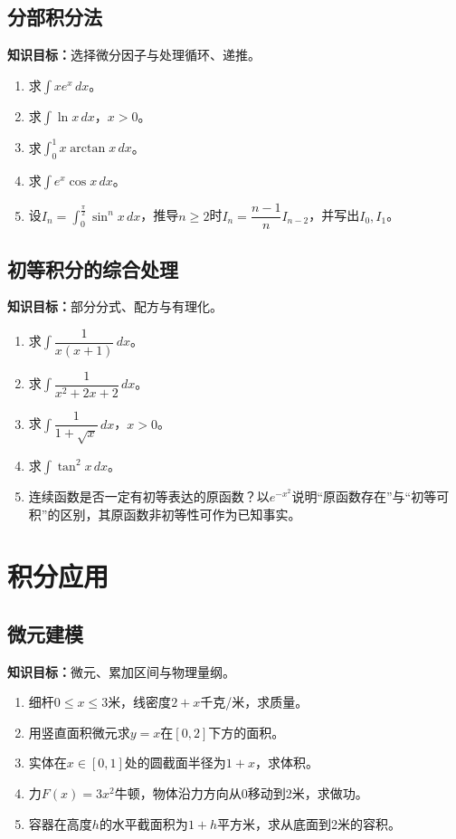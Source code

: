 \documentclass[11pt,a4paper,fontset=fandol]{ctexrep}
\newcommand{\goal}[1]{\textbf{知识目标：}#1\par}
\begin{document}
\subsection{分部积分法}
\goal{选择微分因子与处理循环、递推。}
\begin{enumerate}
\item 求$\int xe^x\,dx$。
\item 求$\int\ln x\,dx$，$x>0$。
\item 求$\int_0^1x\arctan x\,dx$。
\item 求$\int e^x\cos x\,dx$。
\item 设$I_n=\int_0^{\frac{\pi}{2}}\sin^nx\,dx$，推导$n\ge2$时$I_n=\dfrac{n-1}{n}I_{n-2}$，并写出$I_0,I_1$。
\end{enumerate}
\subsection{初等积分的综合处理}
\goal{部分分式、配方与有理化。}
\begin{enumerate}
\item 求$\int\dfrac{1}{x(x+1)}\,dx$。
\item 求$\int\dfrac{1}{x^2+2x+2}\,dx$。
\item 求$\int\dfrac{1}{1+\sqrt x}\,dx$，$x>0$。
\item 求$\int\tan^2x\,dx$。
\item 连续函数是否一定有初等表达的原函数？以$e^{-x^2}$说明“原函数存在”与“初等可积”的区别，其原函数非初等性可作为已知事实。
\end{enumerate}
\section{积分应用}
\subsection{微元建模}
\goal{微元、累加区间与物理量纲。}
\begin{enumerate}
\item 细杆$0\le x\le3$米，线密度$2+x$千克/米，求质量。
\item 用竖直面积微元求$y=x$在$[0,2]$下方的面积。
\item 实体在$x\in[0,1]$处的圆截面半径为$1+x$，求体积。
\item 力$F(x)=3x^2$牛顿，物体沿力方向从0移动到2米，求做功。
\item 容器在高度$h$的水平截面积为$1+h$平方米，求从底面到2米的容积。
\end{enumerate}
\end{document}
